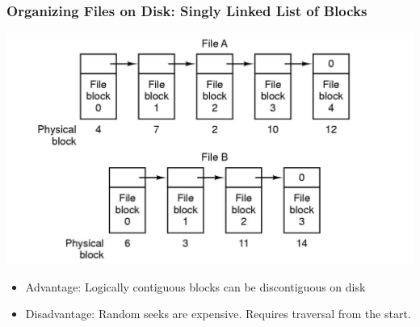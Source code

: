 \documentclass[12pt]{article}
\begin{document}
\subsubsection{Organizing Files on Disk: Singly Linked List of Blocks}
\includegraphics[width=\textwidth]{SinglyLinkedList.png}
\begin{itemize}
    \item Advantage: Logically contiguous blocks can be discontiguous on disk 
    \item Disadvantage: Random seeks are expensive. Requires traversal from the start.
\end{itemize}
\end{document}
